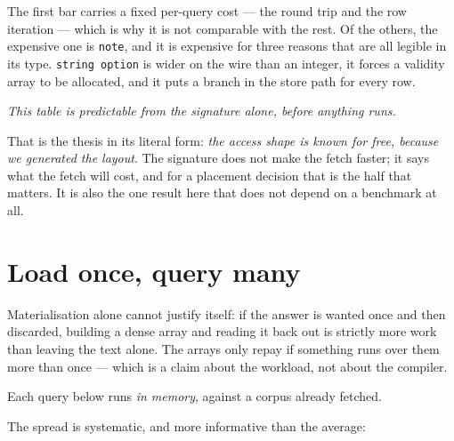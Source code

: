 \documentclass[11pt,a4paper]{article}
\begin{document}
The first bar carries a fixed per-query cost --- the round trip and the row iteration
--- which is why it is not comparable with the rest. Of the others, the expensive one
is \texttt{note}, and it is expensive for three reasons that are all legible in its
type. \texttt{string option} is wider on the wire than an integer, it forces a validity
array to be allocated, and it puts a branch in the store path for every row.

\begin{center}\itshape
This table is predictable from the signature alone, before anything runs.
\end{center}

\noindent
That is the thesis in its literal form: \emph{the access shape is known for free,
because we generated the layout}. The signature does not make the fetch faster; it says
what the fetch will cost, and for a placement decision that is the half that matters.
It is also the one result here that does not depend on a benchmark at all.

\section{Load once, query many}

Materialisation alone cannot justify itself: if the answer is wanted once and then
discarded, building a dense array and reading it back out is strictly more work than
leaving the text alone. The arrays only repay if something runs over them more than
once --- which is a claim about the workload, not about the compiler.

Each query below runs \emph{in memory}, against a corpus already fetched.

\begin{center}
\end{center}

The spread is systematic, and more informative than the average:
\end{document}
